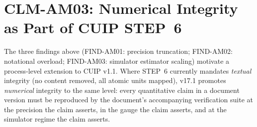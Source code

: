 \documentclass[12pt, a4paper]{article}
\begin{document}
\section{CLM-AM03: Numerical Integrity as Part of CUIP STEP~6}

The three findings above (FIND-AM01: precision truncation;
FIND-AM02: notational overload; FIND-AM03: simulator estimator
scaling) motivate a process-level extension to CUIP v1.1. Where
STEP~6 currently mandates \emph{textual} integrity (no content
removed, all atomic units mapped), v17.1 promotes \emph{numerical}
integrity to the same level: every quantitative claim in a document
version must be reproduced by the document's accompanying
verification suite at the precision the claim asserts, in the gauge
the claim asserts, and at the simulator regime the claim asserts.
\end{document}
